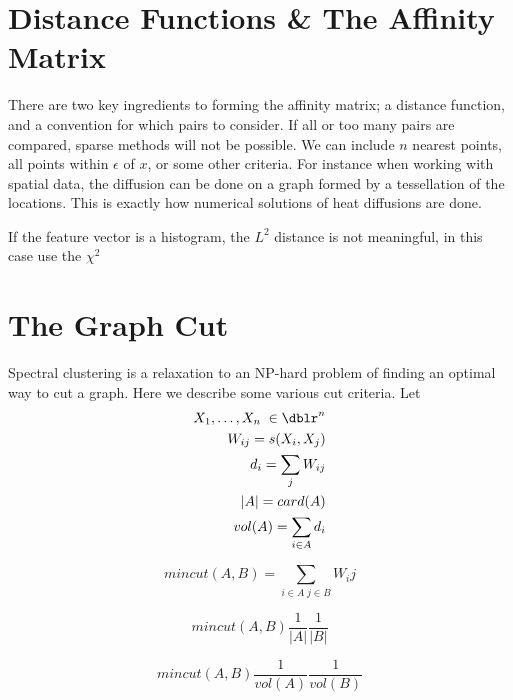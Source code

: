 \section{Distance Functions \& The Affinity Matrix}

There are two key ingredients to forming the affinity matrix; a distance function, and a convention for which pairs to consider.  If all or too many pairs are compared, sparse methods will not be possible.  We can include $n$ nearest points, all points within $\epsilon$ of $x$, or some other criteria. For instance when working with spatial data, the diffusion can be done on a graph formed by a tessellation of the locations.  This is exactly how numerical solutions of heat diffusions are done.

If the feature vector is a histogram, the $L^2$ distance is not meaningful, in this case use the $\chi^2$

\section{The Graph Cut}
Spectral clustering is a relaxation to an NP-hard problem of finding an optimal way to cut a graph. Here we describe some various cut criteria.  Let
\begin{eqnarray*}
X_1, \hdots , X_n \; \in \dblr^n  \\
W_{ij} = s(X_i,X_j) \\
d_i = \sum_{j} W_{i j}\\
|A| = card (A) \\
vol(A) = \sum_{i \in A} d_i
\end{eqnarray*}

\begin{defn}
\begin{equation*} min cut(A,B) =\sum_{i \in A \; j \in B}  W_ij \end{equation*}
\end{defn}

\begin{defn}
\begin{equation*} min cut (A,B) \frac{1}{|A|} \frac{1}{|B|} \end{equation*}
\end{defn}
\begin{defn}[n Cut ]
\begin{equation*} min cut (A,B) \frac{1}{vol(A)} \frac{1}{vol(B)} \end{equation*}
\end{defn}


